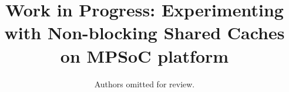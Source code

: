 \documentclass[10pt,conference]{IEEEtran}
\begin{document}
\newcommand\schim{SchIM\xspace}
\newcommand\schimL{Scheduler In-the-Middle\xspace}
\newcommand\schiml{scheduler in-the-middle\xspace}
\newcommand\axiin[1]{$\texttt{HPM}_{#1}$\xspace}
\newcommand\axiout[1]{$\texttt{HPS}_{#1}$\xspace}
\newcommand\axiconf[1]{$\texttt{LPM}_{#1}$\xspace}

\newcommand{\fig}[1]{Fig.~\ref{#1}}

\newcommand*\circledfig[2]{Fig.~\ref{#1}\tikz[baseline=0pt]{\node[anchor=south west,red,shape=circle,draw,inner sep=1pt] (char) {\scriptsize#2};}}

\newcommand*\circled[1]{\tikz[baseline=0pt]{\node[anchor=south west,red,shape=circle,draw,inner sep=1pt] (char) {\scriptsize#1};}}

\title{
    Work in Progress: Experimenting with Non-blocking Shared Caches on MPSoC platform
}

\author{


    Authors omitted for review.
}
\end{document}
